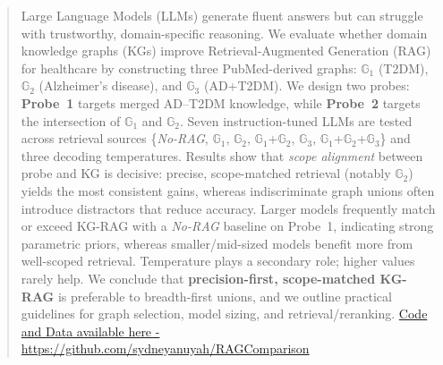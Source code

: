 \documentclass[conference]{IEEEtran}
\begin{document}




\maketitle

\begin{abstract}
Large Language Models (LLMs) generate fluent answers but can struggle with trustworthy, domain-specific reasoning. We evaluate whether domain knowledge graphs (KGs) improve Retrieval-Augmented Generation (RAG) for healthcare by constructing three PubMed-derived graphs: \textbf{$\mathbb{G}_1$} (T2DM), \textbf{$\mathbb{G}_2$} (Alzheimer’s disease), and \textbf{$\mathbb{G}_3$} (AD+T2DM). We design two probes: \textbf{Probe~1} targets merged AD--T2DM knowledge, while \textbf{Probe~2} targets the intersection of \textbf{$\mathbb{G}_1$}  and  \textbf{$\mathbb{G}_2$}. Seven instruction-tuned LLMs are tested across retrieval sources \{\textit{No-RAG}, $\mathbb{G}_1$, $\mathbb{G}_2$, $\mathbb{G}_1${+}$\mathbb{G}_2$, $\mathbb{G}_3$, $\mathbb{G}_1${+}$\mathbb{G}_2${+}$\mathbb{G}_3$\} and three decoding temperatures. Results show that \emph{scope alignment} between probe and KG is decisive: precise, scope-matched retrieval (notably $\mathbb{G}_2$) yields the most consistent gains, whereas indiscriminate graph unions often introduce distractors that reduce accuracy. Larger models frequently match or exceed KG-RAG with a \textit{No-RAG} baseline on Probe~1, indicating strong parametric priors, whereas smaller/mid-sized models benefit more from well-scoped retrieval. Temperature plays a secondary role; higher values rarely help. We conclude that \textbf{precision-first, scope-matched KG-RAG} is preferable to breadth-first unions, and we outline practical guidelines for graph selection, model sizing, and retrieval/reranking. \href{https://github.com/sydneyanuyah/RAGComparison}{Code and Data available here - https://github.com/sydneyanuyah/RAGComparison}
\end{abstract}






%
\IEEEpeerreviewmaketitle
\end{document}

